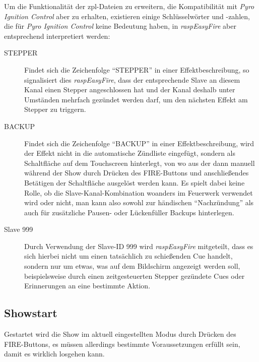\documentclass[paper=a4, parskip, numbers=noenddot, toc=listof, headsepline]{scrbook}
\newcommand{\pic}{\emph{Pyro Ignition Control}}
\newcommand{\REF}{\emph{raspEasyFire}}
\begin{document}
				Um die Funktionalität der zpl-Dateien zu erweitern, die Kompatibilität mit \pic{} aber zu erhalten, existieren einige Schlüsselwörter und -zahlen, die für \pic{} keine Bedeutung haben, in \REF{} aber entsprechend interpretiert werden:
				\begin{description}
					\item [STEPPER]
					Findet sich die Zeichenfolge \enquote{STEPPER} in einer Effektbeschreibung, so signalisiert dies \REF{}, dass der entsprechende Slave an diesem Kanal einen Stepper angeschlossen hat und der Kanal deshalb unter Umständen mehrfach gezündet werden darf, um den nächsten Effekt am Stepper zu triggern.
					\item [BACKUP]
					Findet sich die Zeichenfolge \enquote{BACKUP} in einer Effektbeschreibung, wird der Effekt nicht in die automatische Zündliste eingefügt, sondern als Schaltfläche auf dem Touchscreen hinterlegt, von wo aus der dann manuell während der Show durch Drücken des FIRE-Buttons und anschließendes Betätigen der Schaltfläche ausgelöst werden kann. Es spielt dabei keine Rolle, ob die Slave-Kanal-Kombination woanders im Feuerwerk verwendet wird oder nicht, man kann also sowohl zur händischen \enquote{Nachzündung} als auch für zusätzliche Pausen- oder Lückenfüller Backups hinterlegen.
					\item [Slave 999]
					Durch Verwendung der Slave-ID 999 wird \REF{} mitgeteilt, dass es sich hierbei nicht um einen tatsächlich zu schießenden Cue handelt, sondern nur um etwas, was auf dem Bildschirm angezeigt werden soll, beispielsweise durch einen zeitgesteuerten Stepper gezündete Cues oder Erinnerungen an eine bestimmte Aktion.
				\end{description}

			\subsection{Showstart}

				Gestartet wird die Show im aktuell eingestellten Modus durch Drücken des FIRE-Buttons, es müssen allerdings bestimmte Voraussetzungen erfüllt sein, damit es wirklich losgehen kann.
\end{document}
